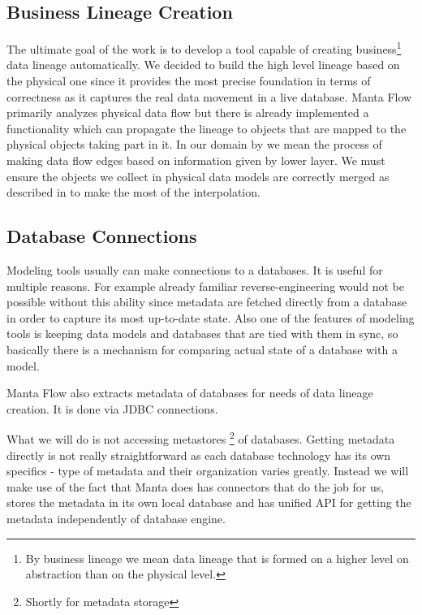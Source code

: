 \subsection{Business Lineage Creation}
The ultimate goal of the work is to develop a tool capable of creating business\footnote{By business lineage we mean data lineage that is formed on a higher level on abstraction than on the physical level.} data lineage automatically.
We decided to build the high level lineage based on the physical one since it provides the most precise foundation in terms of correctness as it captures the real data movement in a live database.
Manta Flow primarily analyzes physical data flow but there is already implemented a functionality which can propagate the lineage to objects that are mapped to the physical objects taking part in it.
In our domain by  we mean the process of making data flow edges based on information given by lower layer.
We must ensure the objects we collect in physical data models are correctly merged as described in  to make the most of the interpolation.

\subsection{Database Connections}

Modeling tools usually can make connections to a databases. It is useful for multiple reasons. For example already familiar reverse-engineering would not be possible without this ability since metadata are fetched directly from a database in order to capture its most up-to-date state. Also one of the features of modeling tools is keeping data models and databases that are tied with them in sync, so basically there is a mechanism for comparing actual state of a database with a model. 

Manta Flow also extracts metadata of databases for needs of data lineage creation. It is done via JDBC connections.

What we will do is not accessing metastores \footnote{Shortly for metadata storage} of databases. Getting metadata directly is not really straightforward as each database technology has its own specifics - type of metadata and their organization varies greatly. Instead we will make use of the fact that Manta does has connectors that do the job for us, stores the metadata in its own local database and has unified API for getting the metadata independently of database engine. 

